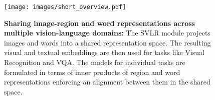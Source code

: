 \begin{figure}[t]

\centering
\texttt{[image: images/short\_overview.pdf]}
\vspace{-7mm}
\caption{\textbf{Sharing image-region and word representations across multiple vision-language domains:} The SVLR module projects images and words into a shared representation space. The resulting visual and textual embeddings are then used for tasks like Visual Recognition and VQA. The models for individual tasks are formulated in terms of inner products of region and word representations enforcing an alignment between them in the shared space.}
\vspace{-6mm}
\label{fig:short_overview}
\end{figure}